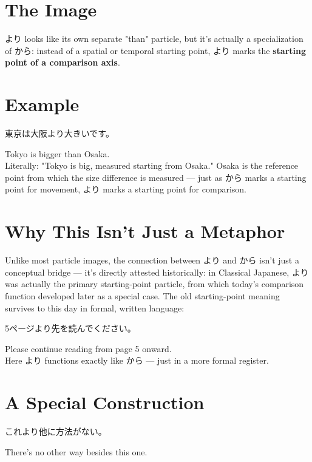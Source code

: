 \documentclass[12pt]{book}
\begin{document}
\section*{The Image}

より looks like its own separate "than" particle, but it's actually a specialization of から: instead of a spatial or temporal starting point, より marks the \textbf{starting point of a comparison axis}.

\section*{Example}

\par\quad 東京は大阪より大きいです。\\
\par\quad Tokyo is bigger than Osaka.\\

Literally: "Tokyo is big, measured starting from Osaka." Osaka is the reference point from which the size difference is measured — just as から marks a starting point for movement, より marks a starting point for comparison.

\section*{Why This Isn't Just a Metaphor}

Unlike most particle images, the connection between より and から isn't just a conceptual bridge — it's directly attested historically: in Classical Japanese, より was actually the primary starting-point particle, from which today's comparison function developed later as a special case. The old starting-point meaning survives to this day in formal, written language:

\par\quad 5ページより先を読んでください。\\
\par\quad Please continue reading from page 5 onward.\\

Here より functions exactly like から — just in a more formal register.

\section*{A Special Construction}

\par\quad これより他に方法がない。\\
\par\quad There's no other way besides this one.\\
\end{document}
